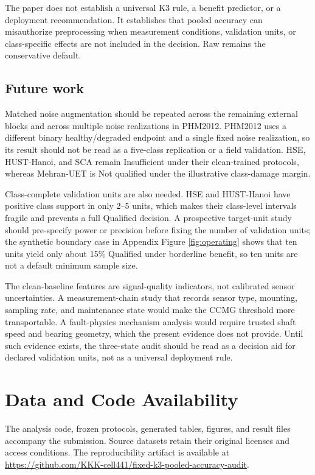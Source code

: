 \documentclass[11pt]{article}
\begin{document}
The paper does not establish a universal K3 rule, a benefit predictor, or a
deployment recommendation. It establishes that pooled accuracy can misauthorize
preprocessing when measurement conditions, validation units, or class-specific
effects are not included in the decision. Raw remains the conservative default.

\subsection{Future work}

Matched noise augmentation should be repeated across the remaining external
blocks and across multiple noise realizations in PHM2012. PHM2012 uses a
different binary healthy/degraded endpoint and a single fixed noise
realization, so its result should not be read as a five-class replication or a
field validation. HSE, HUST-Hanoi, and SCA remain Insufficient under their
clean-trained protocols, whereas Mehran-UET is Not qualified under the
illustrative class-damage margin.

Class-complete validation units are also needed. HSE and HUST-Hanoi have
positive class support in only 2--5 units, which makes their class-level
intervals fragile and prevents a full Qualified decision. A prospective
target-unit study should pre-specify power or precision before fixing the number
of validation units; the synthetic boundary case in Appendix Figure
\ref{fig:operating} shows that ten units yield only about 15\% Qualified under
borderline benefit, so ten units are not a default minimum sample size.

The clean-baseline features are signal-quality indicators, not calibrated
sensor uncertainties. A measurement-chain study that records sensor type,
mounting, sampling rate, and maintenance state would make the CCMG threshold
more transportable. A fault-physics mechanism analysis would require trusted
shaft speed and bearing geometry, which the present evidence does not provide.
Until such evidence exists, the three-state audit should be read as a decision
aid for declared validation units, not as a universal deployment rule.

\section*{Data and Code Availability}

The analysis code, frozen protocols, generated tables, figures, and result
files accompany the submission. Source datasets retain their original licenses
and access conditions. The reproducibility artifact is available at
\url{https://github.com/KKK-cell441/fixed-k3-pooled-accuracy-audit}.
\end{document}
